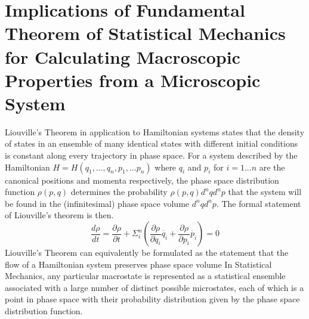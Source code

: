 

\section{Implications of Fundamental Theorem of Statistical Mechanics for Calculating Macroscopic Properties from a Microscopic System}
Liouville's Theorem in application to Hamiltonian systems states that the density of states in an ensemble of many identical states with different initial conditions is constant along every trajectory in phase space. For a system described by the Hamiltonian $H = H(q_{1},...,q_{n},p_{1},...p_{n})$ where $q_{i}$ and $p_{i}$ for $i=1...n$ are the canonical positions and momenta respectively, the phase space distribution function $\rho(p,q)$ determines the probability $\rho(p,q)d^{n}qd^{n}p$ that the system will be found in the (infinitesimal) phase space volume $d^{n}qd^{n}p$. The formal statement of Liouville's theorem is then.
\begin{equation}
\frac{d\rho}{dt} = \frac{\partial\rho}{\partial t} + \Sigma_{i}^{n}(\frac{\partial\rho}{\partial q_{i}}\dot{q_{i}}+\frac{\partial\rho}{\partial p_{i}}\dot{p_{i}}) = 0
\end{equation}
Liouville's Theorem can equivalently be formulated as the statement that the flow of a Hamiltonian system preserves phase space volume
In Statistical Mechanics, any particular macrostate is represented as a statistical ensemble associated with a large number of distinct possible microstates, each of which is a point in phase space with their probability distribution given by the phase space distribution function. 
